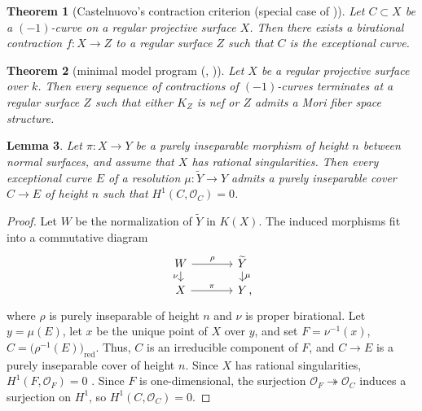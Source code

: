 \documentclass[10pt,abstract=true]{scrartcl}
\numberwithin{equation}{section}
\newtheorem{theorem}{Theorem}[section]
\newtheorem{lemma}[theorem]{Lemma}
\theoremstyle{definition}
\theoremstyle{remark}
\begin{document}
\begin{theorem}[Castelnuovo's contraction criterion (special case of {\cite[Theorem~27.1]{Lipman69}})]%
  Let $C \subset X$ be a $(-1)$-curve on a regular projective surface $X$.
  Then there exists a birational contraction $f\colon X\to Z$ to a regular surface $Z$ such that $C$ is the exceptional curve.
\end{theorem}

\begin{theorem}[minimal model program {(\cite[page 97]{Shafarevich-1966-MMP}, \cite[page 5]{Tanaka-2018-MMP-excelent-surface})}]\label{thm:MMP}%
  Let $X$ be a regular projective surface over $k$.
  Then every sequence of contractions of $(-1)$-curves terminates at a regular surface $Z$ such that either $K_Z$ is nef or $Z$ admits a Mori fiber space structure.
\end{theorem}

\begin{lemma}\label{lemm:height-n}
  Let $\pi\colon X\to Y$ be a purely inseparable morphism of height $n$ between normal surfaces, and assume that $X$ has rational singularities.
  Then every exceptional curve $E$ of a resolution $\mu\colon \widetilde Y\to Y$ admits a purely inseparable cover $C\to E$ of height $n$ such that $H^1(C,\mathcal O_C) = 0$.
\end{lemma}
\begin{proof}
  Let $W$ be the normalization of $\widetilde Y$ in $K(X)$.
  The induced morphisms fit into a commutative diagram
  \[
    \begin{tikzcd}[column sep=large,row sep=small]
      W \ar[r,"\rho"] \ar[d,"\nu"'] & \widetilde Y \ar[d,"\mu"] \\
      X \ar[r,"\pi"] & Y\rlap{\,,}
    \end{tikzcd}
  \]
  where $\rho$ is purely inseparable of height $n$ and $\nu$ is proper birational.
  Let $y=\mu(E)$, let $x$ be the unique point of $X$ over $y$, and set $F=\nu^{-1}(x)$, $C=\bigl(\rho^{-1}(E)\bigr)_{\mathrm{red}}$.
  Thus, $C$ is an irreducible component of $F$, and $C\to E$ is a purely inseparable cover of height $n$.
  Since $X$ has rational singularities, $H^1(F,\mathcal O_{F}) = 0$ \cite[Proposition~1.2]{Lipman69}.
  Since $F$ is one-dimensional, the surjection $\mathcal O_F\twoheadrightarrow\mathcal O_C$ induces a surjection on $H^1$, so $H^1(C,\mathcal O_C)=0$.
\end{proof}
\end{document}

